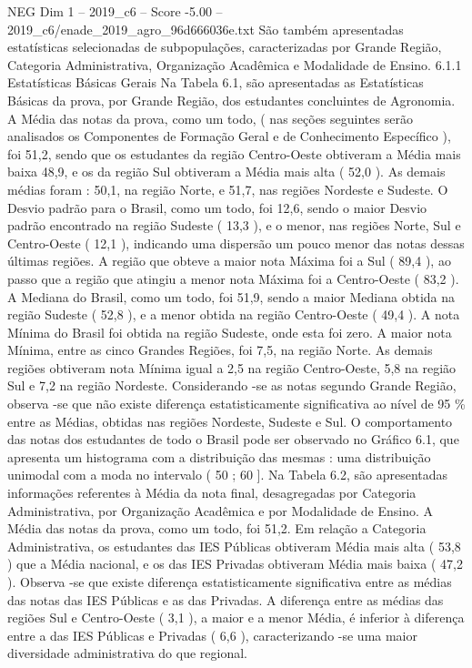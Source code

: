 \begin{textsample}{NEG Dim 1 – 2019\_c6 – Score -5.00 – 2019\_c6/enade\_2019\_agro\_96d666036e.txt}
São também apresentadas estatísticas selecionadas de subpopulações, caracterizadas por Grande Região, Categoria Administrativa, Organização Acadêmica e Modalidade de Ensino. 6.1.1 Estatísticas Básicas Gerais Na Tabela 6.1, são apresentadas as Estatísticas Básicas da prova, por Grande Região, dos estudantes concluintes de Agronomia.
A Média das notas da prova, como um todo, ( nas seções seguintes serão analisados os Componentes de Formação Geral e de Conhecimento Específico ), foi 51,2, sendo que os estudantes da região Centro-Oeste obtiveram a Média mais baixa 48,9, e os da região Sul obtiveram a Média mais alta ( 52,0 ).
As demais médias foram : 50,1, na região Norte, e 51,7, nas regiões Nordeste e Sudeste.
O Desvio padrão para o Brasil, como um todo, foi 12,6, sendo o maior Desvio padrão encontrado na região Sudeste ( 13,3 ), e o menor, nas regiões Norte, Sul e Centro-Oeste ( 12,1 ), indicando uma dispersão um pouco menor das notas dessas últimas regiões.
A região que obteve a maior nota Máxima foi a Sul ( 89,4 ), ao passo que a região que atingiu a menor nota Máxima foi a Centro-Oeste ( 83,2 ).
A Mediana do Brasil, como um todo, foi 51,9, sendo a maior Mediana obtida na região Sudeste ( 52,8 ), e a menor obtida na região Centro-Oeste ( 49,4 ).
A nota Mínima do Brasil foi obtida na região Sudeste, onde esta foi zero.
A maior nota Mínima, entre as cinco Grandes Regiões, foi 7,5, na região Norte.
As demais regiões obtiveram nota Mínima igual a 2,5 na região Centro-Oeste, 5,8 na região Sul e 7,2 na região Nordeste.
Considerando -se as notas segundo Grande Região, observa -se que não existe diferença estatisticamente significativa ao nível de 95 \% entre as Médias, obtidas nas regiões Nordeste, Sudeste e Sul.
O comportamento das notas dos estudantes de todo o Brasil pode ser observado no Gráfico 6.1, que apresenta um histograma com a distribuição das mesmas : uma distribuição unimodal com a moda no intervalo ( 50 ; 60 ].
Na Tabela 6.2, são apresentadas informações referentes à Média da nota final, desagregadas por Categoria Administrativa, por Organização Acadêmica e por Modalidade de Ensino.
A Média das notas da prova, como um todo, foi 51,2.
Em relação a Categoria Administrativa, os estudantes das IES Públicas obtiveram Média mais alta ( 53,8 ) que a Média nacional, e os das IES Privadas obtiveram Média mais baixa ( 47,2 ).
Observa -se que existe diferença estatisticamente significativa entre as médias das notas das IES Públicas e as das Privadas.
A diferença entre as médias das regiões Sul e Centro-Oeste ( 3,1 ), a maior e a menor Média, é inferior à diferença entre a das IES Públicas e Privadas ( 6,6 ), caracterizando -se uma maior diversidade administrativa do que regional.

\end{textsample}

